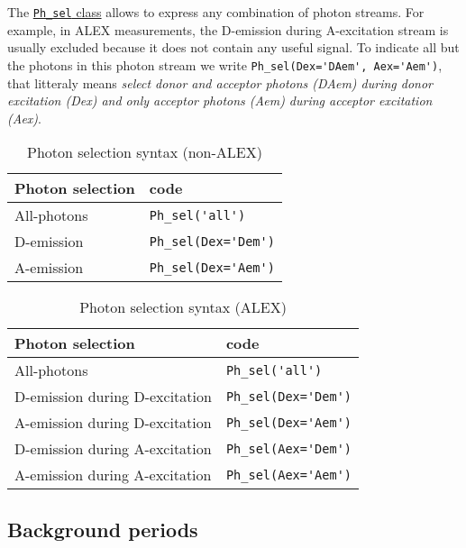 The \href{http://fretbursts.readthedocs.org/en/latest/ph_sel.html}{\texttt{Ph\_sel} class} allows to express any combination of photon streams. 
For example, in ALEX measurements, the D-emission during A-excitation stream is usually excluded because it does not contain any useful signal\cite{Lee_2005}. To indicate all but the photons in this photon stream we write \verb|Ph_sel(Dex='DAem', Aex='Aem')|, that litteraly means \textit{select donor and acceptor photons (DAem) during donor excitation (Dex) and only acceptor photons (Aem) during acceptor excitation (Aex)}.

\begin{table}
\begin{tabular}{l|l}
  Photon selection  & code \\
  \hline
  All-photons       & \verb|Ph_sel('all')|\\
  D-emission    & \verb|Ph_sel(Dex='Dem')|\\
  A-emission & \verb|Ph_sel(Dex='Aem')|\\
\end{tabular}
\caption{\label{tab:ph_sel_smfret}Photon selection syntax (non-ALEX)}
\end{table}

\begin{table}
\begin{tabular}{l|l}
  Photon selection  & code \\
  \hline
  All-photons & \verb|Ph_sel('all')|\\
  D-emission during D-excitation & \verb|Ph_sel(Dex='Dem')|\\
  A-emission during D-excitation & \verb|Ph_sel(Dex='Aem')|\\
  D-emission during A-excitation & \verb|Ph_sel(Aex='Dem')|\\
  A-emission during A-excitation & \verb|Ph_sel(Aex='Aem')|\\
\end{tabular}
\caption{\label{tab:ph_sel_alex}Photon selection syntax (ALEX)}
\end{table}

\subsection{Background periods}
\label{sec:bg_intro}


